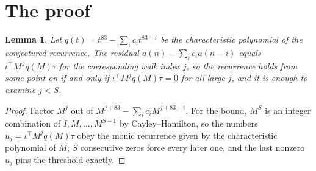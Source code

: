 \documentclass[11pt,a4paper]{article}
\theoremstyle{plain}
\newtheorem{lemma}[theorem]{Lemma}
\theoremstyle{definition}
\begin{document}
\section{The proof}

\begin{lemma}\label{lem:crit}
Let $q(t)=t^{83}-\sum_i c_it^{83-i}$ be the characteristic polynomial of the
conjectured recurrence. The residual $a(n)-\sum_ic_ia(n-i)$ equals
$\iota^{\!\top}M^{\,j}q(M)\tau$ for the corresponding walk index $j$, so the recurrence
holds from some point on if and only if $\iota^{\!\top}M^{j}q(M)\tau=0$ for all large $j$,
and it is enough to examine $j<S$.
\end{lemma}

\begin{proof}
Factor $M^{j}$ out of $M^{j+83}-\sum_ic_iM^{j+83-i}$. For the bound, $M^{S}$
is an integer combination of $I,M,\dots,M^{S-1}$ by Cayley--Hamilton, so the numbers
$u_j=\iota^{\!\top}M^{j}q(M)\tau$ obey the monic recurrence given by the characteristic
polynomial of $M$; $S$ consecutive zeros force every later one, and the last nonzero $u_j$
pins the threshold exactly.
\end{proof}
\end{document}
